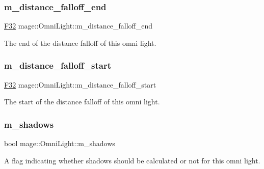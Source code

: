 \subsubsection{\texorpdfstring{m\+\_\+distance\+\_\+falloff\+\_\+end}{m\_distance\_falloff\_end}}
{\footnotesize\ttfamily \hyperlink{namespacemage_aa97e833b45f06d60a0a9c4fc22ae02c0}{F32} mage\+::\+Omni\+Light\+::m\+\_\+distance\+\_\+falloff\+\_\+end\hspace{0.3cm}{\ttfamily [private]}}

The end of the distance falloff of this omni light. \hypertarget{classmage_1_1_omni_light_a1f879f4aaf9b9e7545ee5efb91b45dc5}{}\label{classmage_1_1_omni_light_a1f879f4aaf9b9e7545ee5efb91b45dc5} 
\subsubsection{\texorpdfstring{m\+\_\+distance\+\_\+falloff\+\_\+start}{m\_distance\_falloff\_start}}
{\footnotesize\ttfamily \hyperlink{namespacemage_aa97e833b45f06d60a0a9c4fc22ae02c0}{F32} mage\+::\+Omni\+Light\+::m\+\_\+distance\+\_\+falloff\+\_\+start\hspace{0.3cm}{\ttfamily [private]}}

The start of the distance falloff of this omni light. \hypertarget{classmage_1_1_omni_light_a63e5dab12be5021815e98c81dd9aed6a}{}\label{classmage_1_1_omni_light_a63e5dab12be5021815e98c81dd9aed6a} 
\subsubsection{\texorpdfstring{m\+\_\+shadows}{m\_shadows}}
{\footnotesize\ttfamily bool mage\+::\+Omni\+Light\+::m\+\_\+shadows\hspace{0.3cm}{\ttfamily [private]}}

A flag indicating whether shadows should be calculated or not for this omni light. 